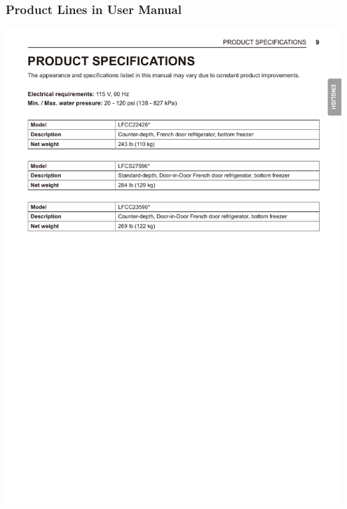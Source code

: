 \documentclass[usenames]{beamer}
\begin{document}
\begin{frame}

\frametitle{Product Lines in User Manual}

\includegraphics[width=0.95\textwidth]{../figures/FrigFamily.pdf}

\end{frame}

\end{document}
